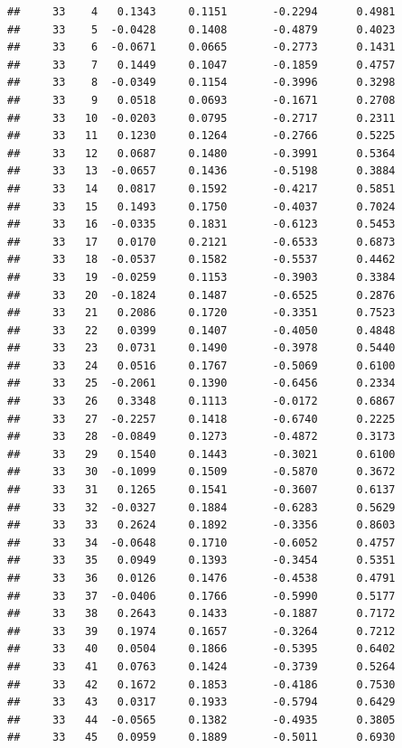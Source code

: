 \documentclass[
]{article}
\begin{document}
\begin{verbatim}
##     33    4   0.1343     0.1151       -0.2294      0.4981  
##     33    5  -0.0428     0.1408       -0.4879      0.4023  
##     33    6  -0.0671     0.0665       -0.2773      0.1431  
##     33    7   0.1449     0.1047       -0.1859      0.4757  
##     33    8  -0.0349     0.1154       -0.3996      0.3298  
##     33    9   0.0518     0.0693       -0.1671      0.2708  
##     33   10  -0.0203     0.0795       -0.2717      0.2311  
##     33   11   0.1230     0.1264       -0.2766      0.5225  
##     33   12   0.0687     0.1480       -0.3991      0.5364  
##     33   13  -0.0657     0.1436       -0.5198      0.3884  
##     33   14   0.0817     0.1592       -0.4217      0.5851  
##     33   15   0.1493     0.1750       -0.4037      0.7024  
##     33   16  -0.0335     0.1831       -0.6123      0.5453  
##     33   17   0.0170     0.2121       -0.6533      0.6873  
##     33   18  -0.0537     0.1582       -0.5537      0.4462  
##     33   19  -0.0259     0.1153       -0.3903      0.3384  
##     33   20  -0.1824     0.1487       -0.6525      0.2876  
##     33   21   0.2086     0.1720       -0.3351      0.7523  
##     33   22   0.0399     0.1407       -0.4050      0.4848  
##     33   23   0.0731     0.1490       -0.3978      0.5440  
##     33   24   0.0516     0.1767       -0.5069      0.6100  
##     33   25  -0.2061     0.1390       -0.6456      0.2334  
##     33   26   0.3348     0.1113       -0.0172      0.6867  
##     33   27  -0.2257     0.1418       -0.6740      0.2225  
##     33   28  -0.0849     0.1273       -0.4872      0.3173  
##     33   29   0.1540     0.1443       -0.3021      0.6100  
##     33   30  -0.1099     0.1509       -0.5870      0.3672  
##     33   31   0.1265     0.1541       -0.3607      0.6137  
##     33   32  -0.0327     0.1884       -0.6283      0.5629  
##     33   33   0.2624     0.1892       -0.3356      0.8603  
##     33   34  -0.0648     0.1710       -0.6052      0.4757  
##     33   35   0.0949     0.1393       -0.3454      0.5351  
##     33   36   0.0126     0.1476       -0.4538      0.4791  
##     33   37  -0.0406     0.1766       -0.5990      0.5177  
##     33   38   0.2643     0.1433       -0.1887      0.7172  
##     33   39   0.1974     0.1657       -0.3264      0.7212  
##     33   40   0.0504     0.1866       -0.5395      0.6402  
##     33   41   0.0763     0.1424       -0.3739      0.5264  
##     33   42   0.1672     0.1853       -0.4186      0.7530  
##     33   43   0.0317     0.1933       -0.5794      0.6429  
##     33   44  -0.0565     0.1382       -0.4935      0.3805  
##     33   45   0.0959     0.1889       -0.5011      0.6930  

\end{verbatim}
\end{document}
